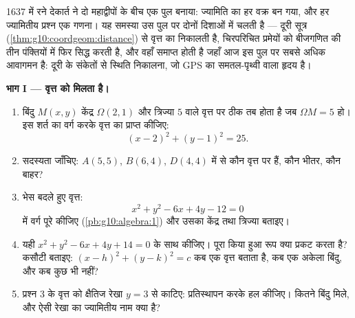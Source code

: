 \begin{problem}
\label{pb:g10:coordgeom:1}
1637 में रने देकार्त ने दो महाद्वीपों के बीच एक पुल बनाया: ज्यामिति का हर
वक्र \emph{} बन गया, और हर ज्यामितीय प्रश्न एक गणना। यह समस्या उस पुल
पर दोनों दिशाओं में चलती है --- दूरी सूत्र (\cref{thm:g10:coordgeom:distance}) से वृत्त का 
निकालती है, चिरपरिचित प्रमेयों को बीजगणित की तीन पंक्तियों में फिर सिद्ध
करती है, और वहाँ समाप्त होती है जहाँ आज इस पुल पर सबसे अधिक आवागमन है: दूरी
के संकेतों से स्थिति निकालना, जो GPS का समतल-पृथ्वी वाला हृदय है।

\medskip
\noindent\textbf{भाग I --- वृत्त को  मिलता है।}
\begin{enumerate}
  \item बिंदु $M(x, y)$ केंद्र $\Omega(2, 1)$ और त्रिज्या $5$ वाले वृत्त पर ठीक तब
        होता है जब $\Omega M = 5$ हो। इस शर्त का वर्ग करके वृत्त का 
        प्राप्त कीजिए:
        \[
        (x - 2)^2 + (y - 1)^2 = 25 .
        \]
  \item सदस्यता जाँचिए: $A(5, 5)$, $B(6, 4)$, $D(4, 4)$ में से कौन वृत्त पर हैं,
        कौन भीतर, कौन बाहर?
  \item भेस बदले हुए वृत्त: \[
        x^2 + y^2 - 6x + 4y - 12 = 0
        \] में वर्ग पूरे कीजिए (\cref{pb:g10:algebra:1}) और उसका
        केंद्र तथा त्रिज्या बताइए।
  \item यही $x^2 + y^2 - 6x + 4y + 14 = 0$ के साथ कीजिए। पूरा किया हुआ रूप क्या प्रकट करता है?
        कसौटी बताइए: $(x - h)^2 + (y - k)^2 = c$ कब एक वृत्त बताता है, कब एक अकेला बिंदु, और
        कब कुछ भी नहीं?
  \item प्रश्न 3 के वृत्त को क्षैतिज रेखा $y = 3$ से काटिए: प्रतिस्थापन
        करके हल कीजिए। कितने बिंदु मिले, और ऐसी रेखा का ज्यामितीय नाम
        क्या है?
\end{enumerate}


\end{problem}
